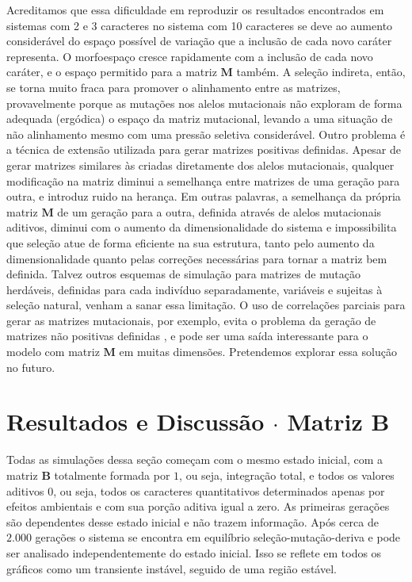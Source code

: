 Acreditamos que essa dificuldade em reproduzir os resultados encontrados
em sistemas com 2 e 3 caracteres no sistema com 10 caracteres se deve ao aumento
considerável do espaço possível de variação que a inclusão de cada novo
caráter representa.
O morfoespaço cresce rapidamente com a inclusão de cada novo caráter, e
o espaço permitido para a matriz $\mathbf{M}$ também.
A seleção indireta, então, se torna muito fraca para promover o
alinhamento entre as matrizes, provavelmente porque as mutações nos
alelos mutacionais não exploram de forma adequada (ergódica) o espaço da
matriz mutacional, levando a uma situação de não alinhamento mesmo com
uma pressão seletiva considerável.
Outro problema é a técnica de extensão utilizada para gerar matrizes
positivas definidas.
Apesar de gerar matrizes similares às criadas diretamente dos alelos
mutacionais, qualquer modificação na matriz diminui a semelhança entre
matrizes de uma geração para outra, e introduz ruido na herança.
Em outras palavras, a semelhança da própria matriz $\mathbf{M}$ de um
geração para a outra, definida através de alelos mutacionais aditivos,
diminui com o aumento da dimensionalidade do sistema e impossibilita que
seleção atue de forma eficiente na sua estrutura, tanto pelo aumento da
dimensionalidade quanto pelas correções necessárias para tornar a matriz
bem definida.
Talvez outros esquemas de simulação para matrizes de mutação herdáveis,
definidas para cada indivíduo separadamente, variáveis e sujeitas à
seleção natural, venham a sanar essa limitação.
O uso de correlações parciais para gerar as matrizes mutacionais, por
exemplo, evita o problema da geração de matrizes não positivas
definidas \citep{Joe2006, Lewandowski2009}, e pode ser uma saída
interessante para o modelo com matriz $\mathbf{M}$ em muitas dimensões.
Pretendemos explorar essa solução no futuro.

\section{Resultados e Discussão $\cdot$ Matriz $\mathbf{B}$}

Todas as simulações dessa seção começam com o mesmo estado inicial, com
a matriz $\mathbf{B}$ totalmente formada por $1$, ou seja, integração
total, e todos os valores aditivos $0$, ou seja, todos os caracteres
quantitativos determinados apenas por efeitos ambientais e com sua
porção aditiva igual a zero.
As primeiras gerações são dependentes desse estado inicial e não trazem
informação.
Após cerca de $2.000$ gerações o sistema se encontra em equilíbrio
seleção-mutação-deriva e pode ser analisado independentemente do estado
inicial.
Isso se reflete em todos os gráficos como um transiente instável, seguido
de uma região estável.

